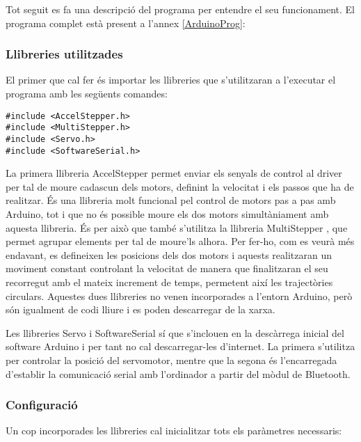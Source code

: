 Tot seguit es fa una descripció del programa per entendre el seu funcionament. El programa complet està present a l’annex \ref{ArduinoProg}:

\subsubsection{Llibreries utilitzades}

El primer que cal fer és importar les llibreries que s’utilitzaran a l'executar el programa amb les següents comandes:

\begin{lstlisting}[style=Arduino]
#include <AccelStepper.h>
#include <MultiStepper.h>
#include <Servo.h>
#include <SoftwareSerial.h>
\end{lstlisting}

La primera llibreria AccelStepper \cite{guiadelallibreriaaccelstepper} permet enviar els senyals de control al driver per tal de moure cadascun dels motors, definint la velocitat i els passos que ha de realitzar. És una llibreria molt funcional pel control de motors pas a pas amb Arduino, tot i que no és possible moure els dos motors simultàniament amb aquesta llibreria. És per això que també s’utilitza la llibreria MultiStepper \cite{guiadelallibreriamultistepper}, que permet agrupar elements per tal de moure’ls alhora. Per fer-ho, com es veurà més endavant, es defineixen les posicions dels dos motors i aquests realitzaran un moviment constant controlant la velocitat de manera que finalitzaran el seu recorregut amb el mateix increment de temps, permetent així les trajectòries circulars. Aquestes dues llibreries no venen incorporades a l'entorn Arduino, però són igualment de codi lliure i es poden descarregar de la xarxa.

Les llibreries Servo i SoftwareSerial sí que s’inclouen en la descàrrega inicial del software Arduino i per tant no cal descarregar-les d’internet. La primera s’utilitza per controlar la posició del servomotor, mentre que la segona és l’encarregada d’establir la comunicació serial amb l’ordinador a partir del mòdul de Bluetooth. 

\subsubsection{Configuració}

Un cop incorporades les llibreries cal inicialitzar tots els paràmetres necessaris: 

